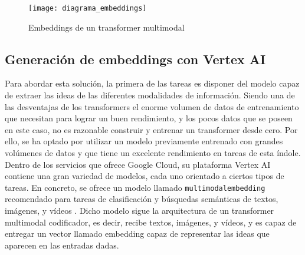 			\begin{figure}[!h]
				\centering
				\texttt{[image: diagrama\_embeddings]}
				\caption{Embeddings de un transformer multimodal}
				\label{fig:diagrama_embeddings}
			\end{figure}
			
			\subsection{Generación de embeddings con Vertex AI}
			
				Para abordar esta solución, la primera de las tareas es disponer del modelo capaz de extraer las ideas de las diferentes modalidades de información. Siendo una de las desventajas de los transformers el enorme volumen de datos de entrenamiento que necesitan para lograr un buen rendimiento, y los pocos datos que se poseen en este caso, no es razonable construir y entrenar un transformer desde cero. Por ello, se ha optado por utilizar un modelo previamente entrenado con grandes volúmenes de datos y que tiene un excelente rendimiento en tareas de esta índole. Dentro de los servicios que ofrece Google Cloud, su plataforma Vertex AI contiene una gran variedad de modelos, cada uno orientado a ciertos tipos de tareas. En concreto, se ofrece un modelo llamado \texttt{multimodalembedding} recomendado para tareas de clasificación y búsquedas semánticas de textos, imágenes, y vídeos \cite{vertex}. Dicho modelo sigue la arquitectura de un transformer multimodal codificador, es decir, recibe textos, imágenes, y vídeos, y es capaz de entregar un vector llamado embedding capaz de representar las ideas que aparecen en las entradas dadas. \\
				
